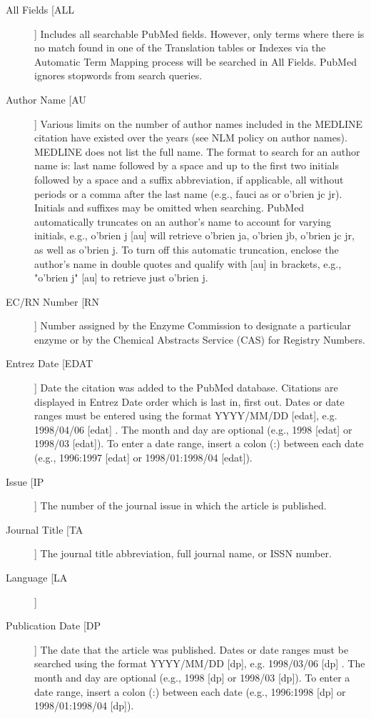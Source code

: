\documentclass[letter,11pt]{book}
\begin{document}
\begin{description}
\item[All Fields [ALL]]  Includes all searchable PubMed fields. However, only terms where there is no match found in one of the Translation tables or Indexes via the Automatic Term Mapping process will be searched in All Fields. PubMed ignores stopwords from search queries. 
\item[Author Name [AU]] Various limits on the number of author names included in the MEDLINE citation have existed over the years (see NLM policy on author names). MEDLINE does not list the full name. The format to search for an author name is: last name followed by a space and up to the first two initials followed by a space and a suffix abbreviation, if applicable, all without periods or a comma after the last name (e.g., fauci as or o'brien jc jr). Initials and suffixes may be omitted when searching. PubMed automatically truncates on an author's name to account for varying initials, e.g., o'brien j [au] will retrieve o'brien ja, o'brien jb, o'brien jc jr, as well as o'brien j. To turn off this automatic truncation, enclose the author's name in double quotes and qualify with [au] in brackets, e.g., "o'brien j" [au] to retrieve just o'brien j. 
\item[EC/RN Number [RN]] Number assigned by the Enzyme Commission to designate a particular enzyme or by the Chemical Abstracts Service (CAS) for Registry Numbers. 
\item[Entrez Date [EDAT]] Date the citation was added to the PubMed database. Citations are displayed in Entrez Date order which is last in, first out. Dates or date ranges must be entered using the format YYYY/MM/DD [edat], e.g. 1998/04/06 [edat] . The month and day are optional (e.g., 1998 [edat] or 1998/03 [edat]). To enter a date range, insert a colon (:) between each date (e.g., 1996:1997 [edat] or 1998/01:1998/04 [edat]). 
\item[Issue [IP]] The number of the journal issue in which the article is published. 
\item[Journal Title [TA]] The journal title abbreviation, full journal name, or ISSN number.
\item[Language [LA]] 
\item[Publication Date [DP]] The date that the article was published. Dates or date ranges must be searched using the format YYYY/MM/DD [dp], e.g. 1998/03/06 [dp] . The month and day are optional (e.g., 1998 [dp] or 1998/03 [dp]). To enter a date range, insert a colon (:) between each date (e.g., 1996:1998 [dp] or 1998/01:1998/04 [dp]). 

\end{description}
\end{document}
